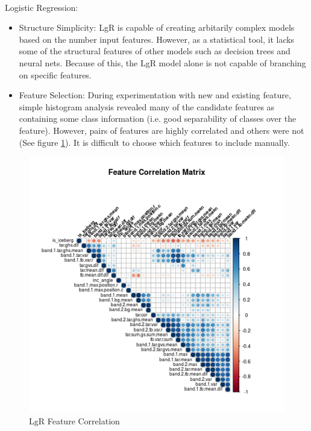 \documentclass[fleqn,10pt]{SelfArx} %
\begin{document}
\paragraph{}Logistic Regression:
\begin{itemize}
	\item{Structure Simplicity:} LgR is capable of creating arbitarily complex models based on the number input features.  However, as a statistical tool, it lacks some of the structural features of other models such as decision trees and neural nets.  Because of this, the LgR model alone is not capable of branching on specific features.
	\item{Feature Selection:} During experimentation with new and existing feature, simple histogram analysis revealed many of the candidate features as containing some class information (i.e. good separability of classes over the feature).  However, pairs of features are highly correlated and others were not (See figure \ref{correlation}).  It is difficult to choose which features to include manually.
\end{itemize}

\begin{figure}
	\includegraphics[width=.9\linewidth]{iceberg/analysis/corr_matrix.png}
	\caption{LgR Feature Correlation}\label{correlation}
\end{figure}
\end{document}
